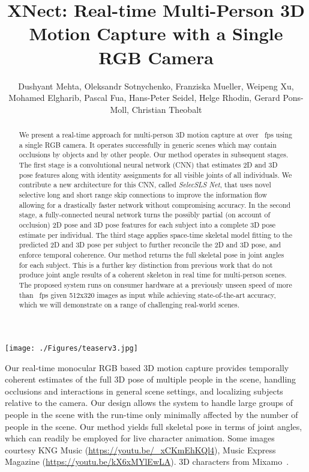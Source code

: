\documentclass[acmtog,authorversion]{acmart}
\newcommand{\ignore}[1]{{}}
\begin{document}
\title{XNect: Real-time Multi-Person 3D Motion Capture with a Single RGB Camera}


\author{
Dushyant Mehta, Oleksandr Sotnychenko, Franziska Mueller, Weipeng Xu, Mohamed Elgharib, Pascal Fua, Hans-Peter Seidel, Helge Rhodin, Gerard Pons-Moll, Christian Theobalt
}

\renewcommand\shortauthors{Mehta, D. et al.}
\begin{teaserfigure}
  \texttt{[image: ./Figures/teaserv3.jpg]}
  \caption
  {Our real-time monocular RGB based 3D motion capture provides temporally coherent estimates of the full 3D pose of multiple people in the scene, handling occlusions and interactions in general scene settings, and localizing subjects relative to the camera. Our design allows the system to handle large groups of people in the scene with the run-time only minimally affected by the number of people in the scene. Our method yields full skeletal pose in terms of joint angles, which can readily be employed for live character animation. Some images courtesy KNG Music (\url{https://youtu.be/_xCKmEhKQl4}), Music Express Magazine (\url{https://youtu.be/kX6xMYlEwLA}). 3D characters from Mixamo~\cite{mixamo}.}
  \label{fig:teaser}
\end{teaserfigure}

\begin{abstract}
We present 
a real-time approach for multi-person 3D motion capture at over ~fps using a single RGB camera. 
\ignore{It operates in generic scenes and is robust to difficult occlusions both by other people and objects.  }
It operates successfully in generic scenes which may contain occlusions by objects and by other people.  
Our method operates in subsequent stages.
The first stage is a convolutional neural network (CNN) that estimates 2D and 3D pose features along with identity assignments for all visible joints of all individuals.
We contribute a new architecture for this CNN, called \textit{SelecSLS Net}, that uses novel selective long and short range skip connections to improve the information flow allowing for a drastically faster network without compromising accuracy.
In the second stage, a fully-connected neural network turns the possibly partial (on account of occlusion) 2D pose and 3D pose features for each subject into a complete 3D pose estimate per individual.
The third stage applies space-time skeletal model fitting to the predicted 2D and 3D pose per subject to further reconcile the 2D and 3D pose, and enforce temporal coherence. Our method returns the full skeletal pose in joint angles for each subject. 
This is a further key distinction from previous work that do not produce joint angle results of a coherent skeleton in real time for multi-person scenes. 
The proposed system runs on consumer hardware at a previously unseen speed of more than ~fps given 512x320 images as input while achieving state-of-the-art accuracy, which we will demonstrate on a range of challenging real-world scenes. 

\end{abstract}
\end{document}
